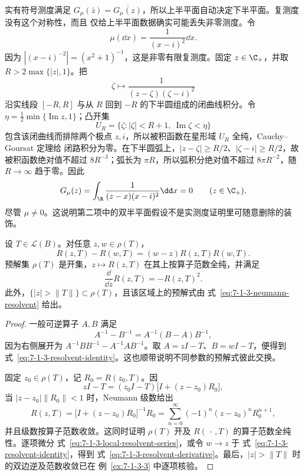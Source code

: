 \begin{remark}[复测度为何需要另一半边界数据]
实有符号测度满足
$G_\mu(\bar z)=\overline{G_\mu(z)}$，所以上半平面自动决定下半平面。复测度没有这个对称性，而且
仅给上半平面数据确实可能丢失非零测度。令
\[
  \mu(\dd x)=\frac1{(x-i)^2}\dd x.
\]
因为 $|(x-i)^{-2}|=(x^2+1)^{-1}$，这是非零有限复测度。固定 $z\in\C_+$，并取
$R>2\max\{|z|,1\}$。把
\[
 \zeta\longmapsto\frac1{(z-\zeta)(\zeta-i)^2}
\]
沿实线段 $[-R,R]$ 与从 $R$ 回到 $-R$ 的下半圆组成的闭曲线积分。令
$\eta=\tfrac12\min\{\operatorname{Im}z,1\}$；凸开集
\[
 U_R=\{\zeta:|\zeta|<R+1,\ \operatorname{Im}\zeta<\eta\}
\]
包含该闭曲线而排除两个极点 $z,i$，所以被积函数在星形域 $U_R$ 全纯，Cauchy--Goursat 定理给
闭路积分为零。在下半圆弧上，$|z-\zeta|\ge R/2$、$|\zeta-i|\ge R/2$，故被积函数绝对值不超过
$8R^{-3}$；弧长为 $\pi R$，所以弧积分绝对值不超过 $8\pi R^{-2}$，随 $R\to\infty$ 趋于零。因此
\[
 G_\mu(z)=\int_\R\frac{1}{(z-x)(x-i)^2}\dd x=0
 \qquad(z\in\C_+),
\]
尽管 $\mu\ne0$。这说明第二项中的双半平面假设不是实测度证明里可随意删除的装饰。
\end{remark}

\begin{proposition}[预解式恒等式]\label{proposition:7-1-3-4}
设 $T\in\mathcal L(B)$。对任意 $z,w\in\rho(T)$，
\[
 R(z,T)-R(w,T)=(w-z)R(z,T)R(w,T).
 \tag{7.1.26}\label{eq:7-1-3-resolvent-identity}
\]
预解集 $\rho(T)$ 是开集，$z\mapsto R(z,T)$ 在其上按算子范数全纯，并满足
\[
  \frac{\dd}{\dd z}R(z,T)=-R(z,T)^2.
 \tag{7.1.27}\label{eq:7-1-3-resolvent-derivative}
\]
此外，$\{|z|>\|T\|\}\subset\rho(T)$，且该区域上的预解式由
式~\eqref{eq:7-1-3-neumann-resolvent} 给出。
\end{proposition}

\begin{proof}
一般可逆算子 $A,B$ 满足
\[
 A^{-1}-B^{-1}=A^{-1}(B-A)B^{-1},
\]
因为右侧展开为 $A^{-1}BB^{-1}-A^{-1}AB^{-1}$。取
$A=zI-T$、$B=wI-T$，便得到
式~\eqref{eq:7-1-3-resolvent-identity}。这也顺带说明不同参数的预解式彼此交换。

固定 $z_0\in\rho(T)$，记 $R_0=R(z_0,T)$。因
\[
 zI-T=(z_0I-T)\bigl[I+(z-z_0)R_0\bigr],
\]
当 $|z-z_0|\|R_0\|<1$ 时，Neumann 级数给出
\[
 R(z,T)
 =\bigl[I+(z-z_0)R_0\bigr]^{-1}R_0
 =\sum_{n=0}^{\infty}(-1)^n(z-z_0)^nR_0^{n+1},
 \tag{7.1.28}\label{eq:7-1-3-local-resolvent-series}
\]
并且级数按算子范数收敛。这同时证明 $\rho(T)$ 开及 $R(\,\cdot\,,T)$ 的算子范数全纯性。逐项微分
式~\eqref{eq:7-1-3-local-resolvent-series}，或令 $w\to z$ 于
式~\eqref{eq:7-1-3-resolvent-identity}，得到
式~\eqref{eq:7-1-3-resolvent-derivative}。最后，$|z|>\|T\|$ 时的双边逆及范数收敛已在
例~\ref{ex:7-1-3-3} 中逐项核验。
\end{proof}

